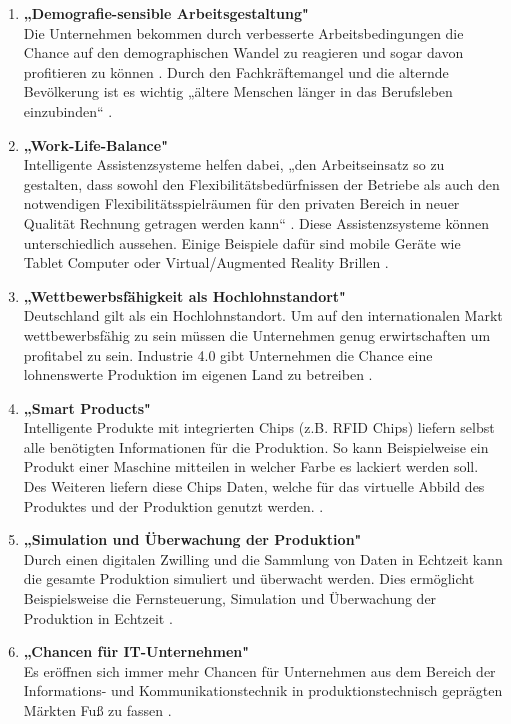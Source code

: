 \begin{enumerate}
	\item \textbf{„Demografie-sensible Arbeitsgestaltung"} \cite[S.20]{12} \\
	Die Unternehmen bekommen durch verbesserte Arbeitsbedingungen die Chance auf den 
	demographischen Wandel zu reagieren und sogar davon profitieren zu können \cite[S.20]{12}. Durch den Fachkräftemangel und die alternde Bevölkerung ist es wichtig 
	„ältere Menschen länger in das Berufsleben einzubinden“ \cite{6}.
	\item \textbf{„Work-Life-Balance"} \cite[S.20]{12} \\
	Intelligente Assistenzsysteme helfen dabei, „den Arbeitseinsatz so zu gestalten, dass sowohl
	den Flexibilitätsbedürfnissen der Betriebe als auch den notwendigen Flexibilitätsspielräumen
	für den privaten Bereich in neuer Qualität Rechnung getragen werden kann“ \cite[S.20]{12}. Diese Assistenzsysteme können unterschiedlich aussehen. Einige Beispiele dafür sind mobile Geräte wie Tablet Computer oder Virtual/Augmented Reality Brillen \cite{6}.
	\item \textbf{„Wettbewerbsfähigkeit als Hochlohnstandort"} \cite[S.20]{12} \\
	Deutschland gilt als ein Hochlohnstandort. Um auf den internationalen Markt 
	wettbewerbsfähig zu sein müssen die Unternehmen genug erwirtschaften um profitabel
	zu sein. Industrie 4.0 gibt Unternehmen die Chance eine lohnenswerte Produktion im eigenen Land zu betreiben \cite[S.20]{12}.
	\item \textbf{„Smart Products"} \cite{6} \\
	Intelligente Produkte mit integrierten Chips (z.B. RFID Chips) liefern selbst alle benötigten
	Informationen für die Produktion. So kann Beispielweise ein Produkt einer Maschine 
	mitteilen in welcher Farbe es lackiert werden soll. Des Weiteren liefern diese Chips Daten, 
	welche für das virtuelle Abbild des Produktes und der Produktion genutzt werden. \cite{6}.
	\item \textbf{„Simulation und Überwachung der Produktion"} \cite{6} \\
	Durch einen digitalen Zwilling und die Sammlung von Daten in Echtzeit kann die gesamte
	Produktion simuliert und überwacht werden. Dies ermöglicht Beispielsweise die
	Fernsteuerung, Simulation und Überwachung der Produktion in Echtzeit \cite{6}.
	\item \textbf{„Chancen für IT-Unternehmen"} \cite[S.7]{2} \\
	Es eröffnen sich immer mehr Chancen für Unternehmen aus dem Bereich der Informations- und Kommunikationstechnik in produktionstechnisch geprägten Märkten Fuß zu fassen \cite[S.7]{2}.
\end{enumerate}

